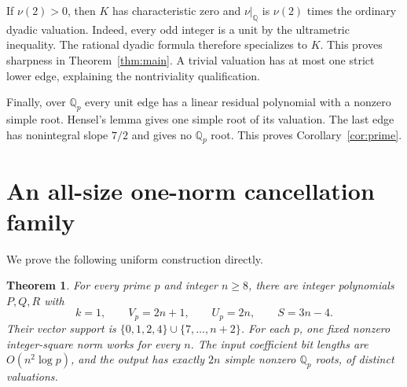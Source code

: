 \documentclass[11pt]{article}
\newtheorem{theorem}{Theorem}[section]
\theoremstyle{remark}\newtheorem{remark}[theorem]{Remark}
\newcommand{\val}{\nu}
\newcommand{\Q}{\mathbb Q}
\begin{document}
If $\val(2)>0$, then $K$ has characteristic zero and $\val|_{\Q}$ is
$\val(2)$ times the ordinary dyadic valuation. Indeed, every odd
integer is a unit by the ultrametric inequality. The rational dyadic
formula therefore specializes to $K$. This proves sharpness in
Theorem~\ref{thm:main}. A trivial valuation has at most one strict
lower edge, explaining the nontriviality qualification.

Finally, over $\Q_p$ every unit edge has a linear residual polynomial
with a nonzero simple root. Hensel's lemma gives one simple root of
its valuation. The last edge has nonintegral slope $7/2$ and gives no
$\Q_p$ root. This proves Corollary~\ref{cor:prime}.

\section{An all-size one-norm cancellation family}\label{sec:family}

We prove the following uniform construction directly.
\begin{theorem}\label{thm:family}
For every prime $p$ and integer $n\ge8$, there are integer polynomials
$P,Q,R$ with
\[
 k=1,\qquad V_p=2n+1,\qquad U_p=2n,\qquad S=3n-4.
\]
Their vector support is $\{0,1,2,4\}\cup\{7,\ldots,n+2\}$.
For each $p$, one fixed nonzero integer-square norm works for every $n$.
The input coefficient bit lengths are $O(n^2\log p)$, and the output
has exactly $2n$ simple nonzero $\Q_p$ roots, of distinct valuations.
\end{theorem}
\end{document}
